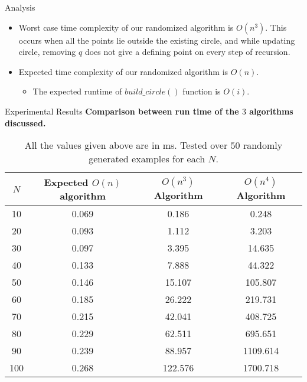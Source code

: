 \documentclass{beamer}
\begin{document}
\begin{frame}{Analysis}
\begin{itemize}
    \item Worst case time complexity of our randomized algorithm is $O(n^3)$. This occurs when all the points lie outside the existing circle, and while updating circle, removing $q$ does not give a defining point on every step of recursion.
    \pause
    \item Expected time complexity of our randomized algorithm is $O(n)$.
    \pause
    \begin{itemize}
        \item The expected runtime of $build\_circle()$ function is $O(i)$.
    \end{itemize}
\end{itemize}
\end{frame}

\begin{frame}{Experimental Results}
\textbf{Comparison between run time of the $3$ algorithms discussed.}
\begin{table}
\centering
\begin{tabular}{|c| c |c |c|} 
 \hline\hline
 $N$ & Expected $O(n)$ algorithm & $O(n^3)$ Algorithm & $O(n^4)$ Algorithm \\ [0.5ex] 
 \hline\hline
10 & 0.069 & 0.186 & 0.248 \\ \hline
20 & 0.093 & 1.112 & 3.203 \\ \hline
30 & 0.097 & 3.395 & 14.635 \\ \hline
40 & 0.133 & 7.888 & 44.322 \\ \hline
50 & 0.146 & 15.107 & 105.807 \\ \hline
60 & 0.185 & 26.222 & 219.731 \\ \hline
70 & 0.215 & 42.041 & 408.725 \\ \hline
80 & 0.229 & 62.511 & 695.651\\ \hline
90 & 0.239 & 88.957 & 1109.614 \\ \hline
100 & 0.268 & 122.576 & 1700.718\\ \hline
\end{tabular}
\caption{All the values given above are in ms. Tested over $50$ randomly generated examples for each $N$.}
\label{Talbe}
\end{table}
\end{frame}
\end{document}
